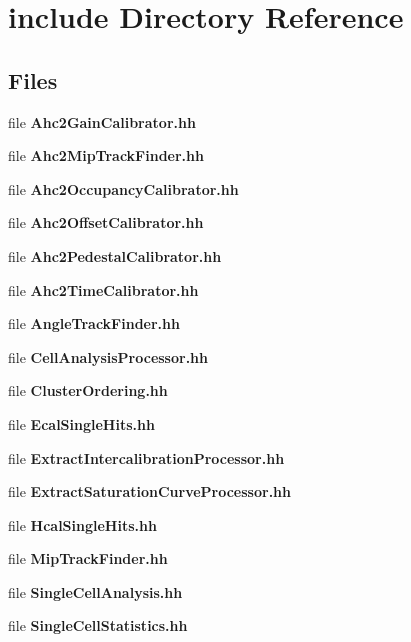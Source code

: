 \section{include Directory Reference}
\label{dir_9e4a086005c8932bc4b1e3b9c2a0eeb3}
\subsection*{Files}
\begin{DoxyCompactItemize}
\item 
file {\bfseries Ahc2\-Gain\-Calibrator.\-hh}
\item 
file {\bfseries Ahc2\-Mip\-Track\-Finder.\-hh}
\item 
file {\bfseries Ahc2\-Occupancy\-Calibrator.\-hh}
\item 
file {\bfseries Ahc2\-Offset\-Calibrator.\-hh}
\item 
file {\bfseries Ahc2\-Pedestal\-Calibrator.\-hh}
\item 
file {\bfseries Ahc2\-Time\-Calibrator.\-hh}
\item 
file {\bfseries Angle\-Track\-Finder.\-hh}
\item 
file {\bfseries Cell\-Analysis\-Processor.\-hh}
\item 
file {\bfseries Cluster\-Ordering.\-hh}
\item 
file {\bfseries Ecal\-Single\-Hits.\-hh}
\item 
file {\bfseries Extract\-Intercalibration\-Processor.\-hh}
\item 
file {\bfseries Extract\-Saturation\-Curve\-Processor.\-hh}
\item 
file {\bfseries Hcal\-Single\-Hits.\-hh}
\item 
file {\bfseries Mip\-Track\-Finder.\-hh}
\item 
file {\bfseries Single\-Cell\-Analysis.\-hh}
\item 
file {\bfseries Single\-Cell\-Statistics.\-hh}
\end{DoxyCompactItemize}
